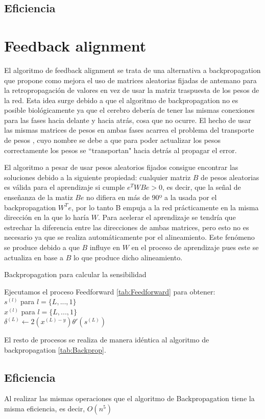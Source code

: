 \subsection{Eficiencia}


\section{Feedback alignment}

El algoritmo de feedback alignment \cite{RefWorks:RefID:9-lillicrap2016random} se trata de una alternativa a backpropagation que propone como mejora el uso de matrices aleatorias fijadas de antemano para la retropropagación de valores en vez de usar la matriz traspuesta de los pesos de la red. Esta idea surge debido a que el algoritmo de backpropagation no es posible biológicamente ya que el cerebro debería de tener las mismas conexiones para las fases hacia delante y hacia atrás, cosa que no ocurre. El hecho de usar las mismas matrices de pesos en ambas fases acarrea el problema del transporte de pesos \cite{RefWorks:RefID:10-grossberg1987competitive}, cuyo nombre se debe a que para poder actualizar los pesos correctamente los pesos se ``transportan" hacia detrás al propagar el error. 

El algoritmo a pesar de usar pesos aleatorios fijados consigue encontrar las soluciones debido a la siguiente propiedad: cualquier matriz $B$ de pesos aleatorias es válida para el aprendizaje si cumple $e^{T}WBe>0$, es decir, que la señal de enseñanza de la matiz $Be$ no difiera en más de 90º a la usada por el backpropagation $W^{T}e$, por lo tanto B empuja a la red prácticamente en la misma dirección en la que lo haría $W$. Para acelerar el aprendizaje se tendría que estrechar la diferencia entre las direcciones de ambas matrices, pero esto no es necesario ya que se realiza automáticamente por el alineamiento. Este fenómeno se produce debido a que $B$ influye en $W$ en el proceso de aprendizaje pues este se actualiza en base a $B$ lo que produce dicho alineamiento.

\begin{algorithm}
   \caption{Backpropagation para calcular la sensibilidad}
   Ejecutamos el proceso Feedforward \ref{tab:Feedforward} para obtener:\\
   $s^{(l)}$ para $l = \{L,...,1\}$ \\
   $x^{(l)}$ para $l = \{L,...,1\}$ \\  
   $\delta^{(L)} \gets 2(x^{(L)-y})\theta'(s^{(L)})$ \\
   
\end{algorithm}

El resto de procesos se realiza de manera idéntica al algoritmo de backpropagation \ref{tab:Backprop}.

\subsection{Eficiencia}

Al realizar las mismas operaciones que el algoritmo de Backpropagation tiene la misma eficiencia, es decir, $O(n^{5})$
